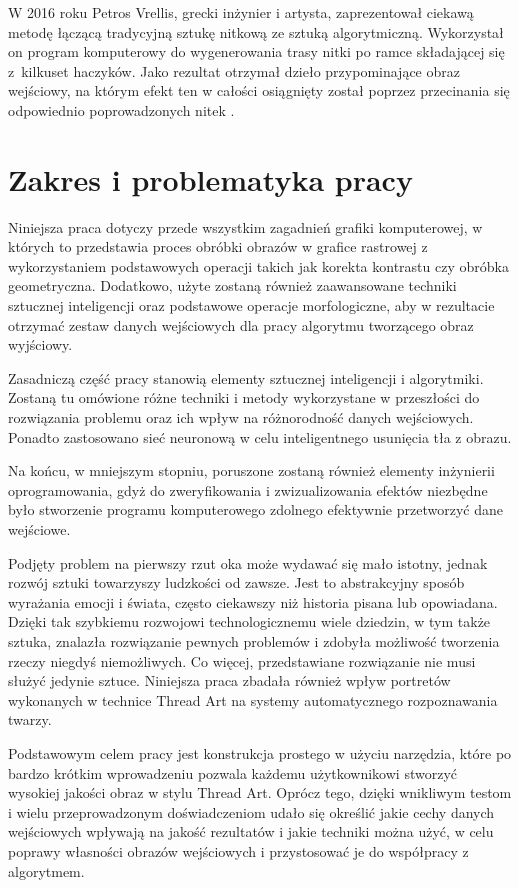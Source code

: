     W 2016 roku Petros Vrellis, grecki inżynier i artysta, zaprezentował ciekawą metodę łączącą tradycyjną sztukę nitkową ze sztuką algorytmiczną. Wykorzystał on program komputerowy do wygenerowania trasy nitki po ramce składającej się z~kilkuset haczyków. Jako rezultat otrzymał dzieło przypominające obraz wejściowy, na którym efekt ten w całości osiągnięty został poprzez przecinania się odpowiednio poprowadzonych nitek \cite{new-way-to-knit}.
    
    \section{Zakres i problematyka pracy} \label{intro-scope}
    Niniejsza praca dotyczy przede wszystkim zagadnień grafiki komputerowej, w których to przedstawia proces obróbki obrazów w grafice rastrowej z wykorzystaniem podstawowych operacji takich jak korekta kontrastu czy obróbka geometryczna. Dodatkowo, użyte zostaną również zaawansowane techniki sztucznej inteligencji oraz podstawowe operacje morfologiczne, aby w rezultacie otrzymać zestaw danych wejściowych dla pracy algorytmu tworzącego obraz wyjściowy.
    
    Zasadniczą część pracy stanowią elementy sztucznej inteligencji i algorytmiki. Zostaną tu omówione różne techniki i metody wykorzystane w przeszłości do rozwiązania problemu oraz ich wpływ na różnorodność danych wejściowych. Ponadto zastosowano sieć neuronową w celu inteligentnego usunięcia tła z obrazu.
    
    Na końcu, w mniejszym stopniu, poruszone zostaną również elementy inżynierii oprogramowania, gdyż do zweryfikowania i zwizualizowania efektów niezbędne było stworzenie programu komputerowego zdolnego efektywnie przetworzyć dane wejściowe.
    
    Podjęty problem na pierwszy rzut oka może wydawać się mało istotny, jednak rozwój sztuki towarzyszy ludzkości od zawsze. Jest to abstrakcyjny sposób wyrażania emocji i świata, często ciekawszy niż historia pisana lub opowiadana. Dzięki tak szybkiemu rozwojowi technologicznemu wiele dziedzin, w tym także sztuka, znalazła rozwiązanie pewnych problemów i zdobyła możliwość tworzenia rzeczy niegdyś niemożliwych. Co więcej, przedstawiane rozwiązanie nie musi służyć jedynie sztuce. Niniejsza praca zbadała również wpływ portretów wykonanych w technice Thread Art na systemy automatycznego rozpoznawania twarzy.
    
    Podstawowym celem pracy jest konstrukcja prostego w użyciu narzędzia, które po bardzo krótkim wprowadzeniu pozwala każdemu użytkownikowi stworzyć wysokiej jakości obraz w stylu Thread Art. Oprócz tego, dzięki wnikliwym testom i wielu przeprowadzonym doświadczeniom udało się określić jakie cechy danych wejściowych wpływają na jakość rezultatów i jakie techniki można użyć, w celu poprawy własności obrazów wejściowych i przystosować je do współpracy z algorytmem.
    
